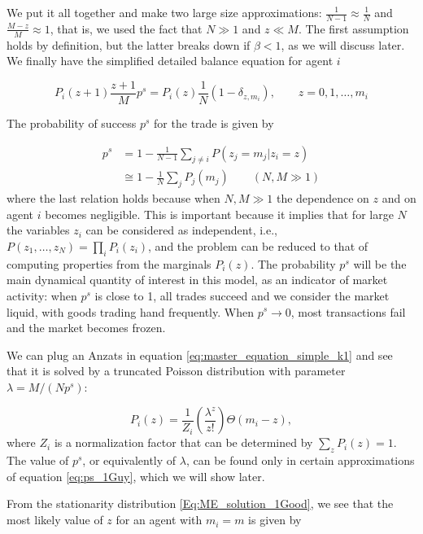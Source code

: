 We put it all together and make two large size approximations: $\frac{1}{N-1} \approx \frac{1}{N}$ and $\frac{M -z}{M} \approx 1$, that is, we used the fact that $N \gg 1$ and $z \ll M$. The first assumption holds by definition, but the latter breaks down if $\beta < 1$, as we will discuss later. We finally have the simplified detailed balance equation for agent $i$


\begin{equation}
P_i(z+1)  \frac{z+1}{M}  p^s =  P_i(z) \frac{1}{N} \left(1-\delta_{z, m_{i}}\right) ,\qquad z=0,1,\ldots, m_i
\label{eq:master_equation_simple_k1}
\end{equation}

The probability of success $p^s$ for the trade is given by

\begin{align}
p^s & =  1-\frac{1}{N-1}\sum_{j\neq i} P(z_j=m_j|z_i=z)\\
 & \cong  1-\frac{1}{N}\sum_{j} P_j(m_j)\qquad (N,M\gg 1)\label{eq:ps_1Guy}
\end{align}
where the last relation holds because when $N,M\gg 1$ the dependence on $z$ and on agent $i$ becomes negligible. This is important because it implies that for large $N$ the variables $z_i$ can be considered as independent, i.e., $P(z_1,\ldots, z_N)=\prod_i P_i(z_i)$, and the problem can be reduced to that of computing properties from the marginals $P_i(z)$. The probability $p^s$ will be the main dynamical quantity of interest in this model, as an indicator of market activity: when $p^s$ is close to 1, all trades succeed and we consider the market liquid, with goods trading hand frequently. When $p^s \to 0$, most transactions fail and the market becomes frozen.

We can plug an Anzats in equation \eqref{eq:master_equation_simple_k1} and see that it is solved by a truncated Poisson distribution with parameter $\lambda = M / (N p^s)$:

\begin{equation}
P_i(z) = \frac{1}{Z_i} \left( \frac{\lambda^{z}}{z!}\right) \Theta\left(m_i - z \right),
\label{Eq:ME_solution_1Good}
\end{equation}
where $Z_i$ is a normalization factor that can be determined by $\sum_{z} P_i(z) = 1$. The value of $p^s$, or equivalently of $\lambda$, can be found only in certain approximations of equation \eqref{eq:ps_1Guy}, which we will show later.


From the stationarity distribution \eqref{Eq:ME_solution_1Good}, we see that the most likely value of $z$ for an agent with $m_i=m$ is given by

